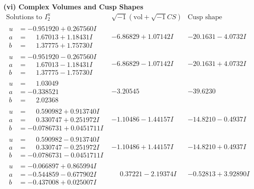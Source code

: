 \documentclass[1p]{elsarticle_modified}
\theoremstyle{definition}
\newcommand{\I}{\sqrt{-1}}
\begin{document}
\newpage\flushleft \textbf{(vi) Complex Volumes and Cusp Shapes}
$$\begin{array}{c|c|c}  
\text{Solutions to }I^u_{2}& \I (\text{vol} + \sqrt{-1}CS) & \text{Cusp shape}\\
 \hline 
\begin{aligned}
u &= -0.951920 + 0.267560 I \\
a &= \phantom{-}1.67013 + 1.18431 I \\
b &= \phantom{-}1.37775 + 1.75730 I\end{aligned}
 & -6.86829 + 1.07142 I & -20.1631 - 4.0732 I \\ \hline\begin{aligned}
u &= -0.951920 - 0.267560 I \\
a &= \phantom{-}1.67013 - 1.18431 I \\
b &= \phantom{-}1.37775 - 1.75730 I\end{aligned}
 & -6.86829 - 1.07142 I & -20.1631 + 4.0732 I \\ \hline\begin{aligned}
u &= \phantom{-}1.03049\phantom{ +0.000000I} \\
a &= -0.338521\phantom{ +0.000000I} \\
b &= \phantom{-}2.02368\phantom{ +0.000000I}\end{aligned}
 & -3.20545\phantom{ +0.000000I} & -39.6230\phantom{ +0.000000I} \\ \hline\begin{aligned}
u &= \phantom{-}0.590982 + 0.913740 I \\
a &= \phantom{-}0.330747 + 0.251972 I \\
b &= -0.0786731 + 0.0451711 I\end{aligned}
 & -1.10486 - 1.44157 I & -14.8210 - 0.4937 I \\ \hline\begin{aligned}
u &= \phantom{-}0.590982 - 0.913740 I \\
a &= \phantom{-}0.330747 - 0.251972 I \\
b &= -0.0786731 - 0.0451711 I\end{aligned}
 & -1.10486 + 1.44157 I & -14.8210 + 0.4937 I \\ \hline\begin{aligned}
u &= -0.066897 + 0.865994 I \\
a &= -0.544859 - 0.677902 I \\
b &= -0.437008 + 0.025007 I\end{aligned}
 & \phantom{-}0.37221 - 2.19374 I & -0.52813 + 3.92890 I \\ \hline\begin{aligned}

\end{aligned}
\end{array}$$
\end{document}
